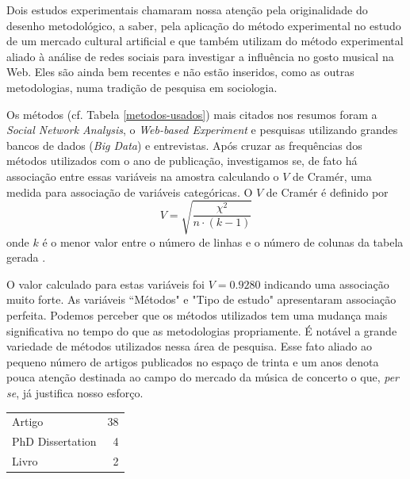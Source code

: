 \documentclass[a4paper, 12pt, openright, oneside, german, french, english, brazil]{abntex2}
\begin{document}
	Dois estudos experimentais chamaram nossa atenção pela originalidade do desenho metodológico, a saber,  pela aplicação do método experimental no estudo de um mercado cultural artificial e  que também utilizam do método experimental aliado à análise de redes sociais para investigar a influência no gosto musical na Web.  Eles são ainda bem recentes e não estão inseridos, como as outras metodologias, numa tradição de pesquisa em sociologia.

	Os métodos (cf. Tabela \ref{metodos-usados}) mais citados nos resumos foram a \textit{Social Network Analysis}, o \textit{Web-based Experiment} e pesquisas utilizando grandes bancos de dados (\textit{Big Data}) e entrevistas. Após cruzar as frequências dos métodos utilizados com o ano de publicação, investigamos se, de fato há associação entre essas variáveis na amostra calculando o $V$ de Cramér, uma medida para associação de variáveis categóricas. O $V$ de Cramér é definido por $$ V = \sqrt{\frac{\chi^2}{n\cdot(k-1)}} $$ onde $k$ é o menor valor entre o número de linhas e o número de colunas da tabela gerada \cite{barbetta2012estatistica}.

	O valor calculado para estas variáveis foi $V=0.9280$ indicando uma associação muito forte. As variáveis ``Métodos" e "Tipo de estudo" apresentaram associação perfeita. Podemos perceber que os métodos utilizados tem uma mudança mais significativa no tempo do que as metodologias propriamente. É notável a grande variedade de métodos utilizados nessa área de pesquisa. Esse fato aliado ao pequeno número de artigos publicados no espaço de trinta e um anos denota pouca atenção destinada ao campo do mercado da música de concerto o que, \textit{per se}, já justifica nosso esforço.







	\begin{table}[ht]
		{\begin{tabular}{lr}
			\hline
			\hline
			Artigo &  38 \\
			PhD Dissertation &   4 \\
			Livro &   2 \\
			\hline
			\end{tabular}
		}
		{}
	\end{table}
\end{document}

